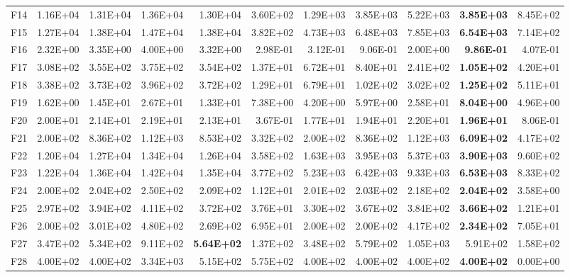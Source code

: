 \begin{tabular}{lrrrrrrrrrr}
F14 & 1.16E+04 & 1.31E+04 & 1.36E+04 & 1.30E+04 & 3.60E+02 & 1.29E+03 & 3.85E+03 & 5.22E+03 & \textbf{3.85E+03} & 8.45E+02 \\
F15 & 1.27E+04 & 1.38E+04 & 1.47E+04 & 1.38E+04 & 3.82E+02 & 4.73E+03 & 6.48E+03 & 7.85E+03 & \textbf{6.54E+03} & 7.14E+02 \\
F16 & 2.32E+00 & 3.35E+00 & 4.00E+00 & 3.32E+00 & 2.98E-01 & 3.12E-01 & 9.06E-01 & 2.00E+00 & \textbf{9.86E-01} & 4.07E-01 \\
F17 & 3.08E+02 & 3.55E+02 & 3.75E+02 & 3.54E+02 & 1.37E+01 & 6.72E+01 & 8.40E+01 & 2.41E+02 & \textbf{1.05E+02} & 4.20E+01 \\
F18 & 3.38E+02 & 3.73E+02 & 3.96E+02 & 3.72E+02 & 1.29E+01 & 6.79E+01 & 1.02E+02 & 3.02E+02 & \textbf{1.25E+02} & 5.11E+01 \\
F19 & 1.62E+00 & 1.45E+01 & 2.67E+01 & 1.33E+01 & 7.38E+00 & 4.20E+00 & 5.97E+00 & 2.58E+01 & \textbf{8.04E+00} & 4.96E+00 \\
F20 & 2.00E+01 & 2.14E+01 & 2.19E+01 & 2.13E+01 & 3.67E-01 & 1.77E+01 & 1.94E+01 & 2.20E+01 & \textbf{1.96E+01} & 8.06E-01 \\
F21 & 2.00E+02 & 8.36E+02 & 1.12E+03 & 8.53E+02 & 3.32E+02 & 2.00E+02 & 8.36E+02 & 1.12E+03 & \textbf{6.09E+02} & 4.17E+02 \\
F22 & 1.20E+04 & 1.27E+04 & 1.34E+04 & 1.26E+04 & 3.58E+02 & 1.63E+03 & 3.95E+03 & 5.37E+03 & \textbf{3.90E+03} & 9.60E+02 \\
F23 & 1.22E+04 & 1.36E+04 & 1.42E+04 & 1.35E+04 & 3.77E+02 & 5.23E+03 & 6.42E+03 & 9.33E+03 & \textbf{6.53E+03} & 8.33E+02 \\
F24 & 2.00E+02 & 2.04E+02 & 2.50E+02 & 2.09E+02 & 1.12E+01 & 2.01E+02 & 2.03E+02 & 2.18E+02 & \textbf{2.04E+02} & 3.58E+00 \\
F25 & 2.97E+02 & 3.94E+02 & 4.11E+02 & 3.72E+02 & 3.76E+01 & 3.30E+02 & 3.67E+02 & 3.84E+02 & \textbf{3.66E+02} & 1.21E+01 \\
F26 & 2.00E+02 & 3.01E+02 & 4.80E+02 & 2.69E+02 & 6.95E+01 & 2.00E+02 & 2.00E+02 & 4.17E+02 & \textbf{2.34E+02} & 7.05E+01 \\
F27 & 3.47E+02 & 5.34E+02 & 9.11E+02 & \textbf{5.64E+02} & 1.37E+02 & 3.48E+02 & 5.79E+02 & 1.05E+03 & 5.91E+02 & 1.58E+02 \\
F28 & 4.00E+02 & 4.00E+02 & 3.34E+03 & 5.15E+02 & 5.75E+02 & 4.00E+02 & 4.00E+02 & 4.00E+02 & \textbf{4.00E+02} & 0.00E+00 \\
\bottomrule
\end{tabular}
